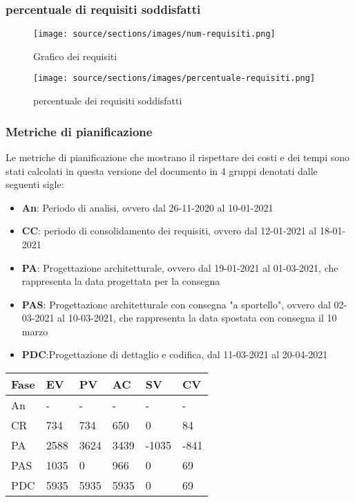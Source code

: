 \subsubsection{percentuale di requisiti soddisfatti}

    \begin{figure}[H]
        \centering
        \texttt{[image: source/sections/images/num-requisiti.png]}
        \caption{Grafico dei requisiti}
    \end{figure}

    \begin{figure}[H]
        \centering
        \texttt{[image: source/sections/images/percentuale-requisiti.png]}
        \caption{percentuale dei requisiti soddisfatti}
    \end{figure}

\subsubsection{Metriche di pianificazione}
    Le metriche di pianificazione che mostrano il rispettare dei costi e dei tempi sono stati calcolati in questa versione del documento in 4 gruppi denotati dalle seguenti sigle:
    \begin{itemize}
        \item \textbf{An}: Periodo di analisi, ovvero dal 26-11-2020 al 10-01-2021
        \item \textbf{CC}: periodo di consolidamento dei requisiti, ovvero dal 12-01-2021 al 18-01-2021
        \item \textbf{PA}: Progettazione architetturale, ovvero dal 19-01-2021 al 01-03-2021, che rappresenta la data progettata per la consegna
        \item \textbf{PAS}: Progettazione architetturale con consegna "a sportello", ovvero dal 02-03-2021 al 10-03-2021, che rappresenta la data spostata con consegna il 10 marzo
        \item \textbf{PDC}:Progettazione di dettaglio e codifica, dal 11-03-2021 al 20-04-2021
    \end{itemize}
    
    
    \begin{longtabu} to \textwidth {| X[0.1,c m] | X[0.1,c m]| X[0.1,c m]| X[0.1,c m]| X[0.1,c m]| X[0.1,c m] |}
        \hline
        \textbf{Fase} &
        \textbf{EV} &
        \textbf{PV} &
        \textbf{AC} &
        \textbf{SV} &
        \textbf{CV} \\
        \hline
        An & - & - & - & - & -  \\ 
        \hline
        CR & 734 & 734 & 650 & 0 & 84 \\
        \hline
        PA & 2588 & 3624 & 3439 & -1035 & -841\\
        \hline
        PAS & 1035 & 0 & 966 & 0 & 69 \\
        \hline
        PDC & 5935 & 5935 & 5935 & 0 & 69 \\
        \hline 
        \end{longtabu}


